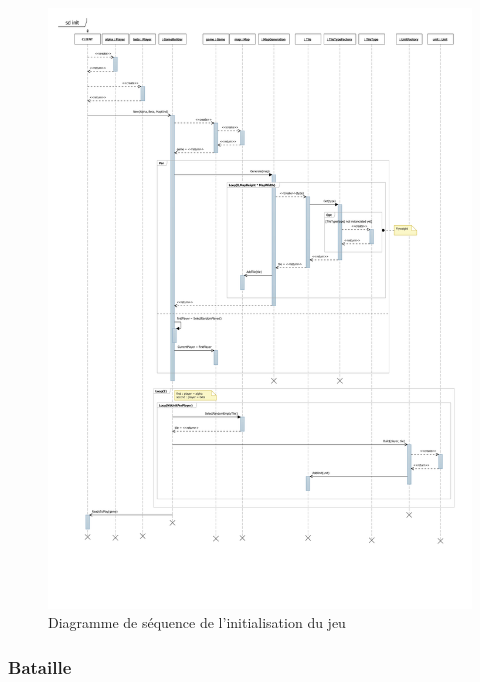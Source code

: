 \begin{figure}[h]
  \centering
  \includegraphics[width=13cm]{schemas/sd_init.png}
  \caption{Diagramme de séquence de l'initialisation du jeu}
  \label{fig:sd_init}
\end{figure}

\subsubsection{Bataille}

